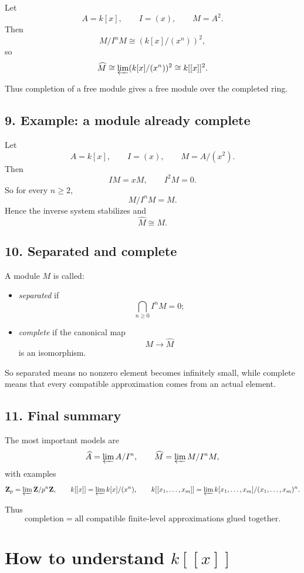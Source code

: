 \documentclass[12pt,a4paper]{article}
\theoremstyle{plain}
\theoremstyle{definition}      %
\begin{document}
	Let
	\[
	A=k[x],\qquad I=(x),\qquad M=A^2.
	\]
	Then
	\[
	M/I^nM \cong (k[x]/(x^n))^2,
	\]
	so
	\[
	\widehat M \cong \varprojlim (k[x]/(x^n))^2 \cong k[[x]]^2.
	\]
	
	Thus completion of a free module gives a free module over the completed ring.
	
	\subsection*{9. Example: a module already complete}
	
	Let
	\[
	A=k[x],\qquad I=(x),\qquad M=A/(x^2).
	\]
	Then
	\[
	IM=xM,\qquad I^2M=0.
	\]
	So for every \(n\ge2\),
	\[
	M/I^nM=M.
	\]
	Hence the inverse system stabilizes and
	\[
	\widehat M\cong M.
	\]
	
	\subsection*{10. Separated and complete}
	
	A module \(M\) is called:
	\begin{itemize}
		\item \emph{separated} if
		\[
		\bigcap_{n\ge0} I^nM=0;
		\]
		\item \emph{complete} if the canonical map
		\[
		M\to \widehat M
		\]
		is an isomorphism.
	\end{itemize}
	
	So separated means no nonzero element becomes infinitely small, while complete means that every compatible approximation comes from an actual element.
	
	\subsection*{11. Final summary}
	
	The most important models are
	\[
	\widehat A=\varprojlim A/I^n,
	\qquad
	\widehat M=\varprojlim M/I^nM,
	\]
	with examples
	\[
	\mathbf Z_p=\varprojlim \mathbf Z/p^n\mathbf Z,
	\qquad
	k[[x]]=\varprojlim k[x]/(x^n),
	\qquad
	k[[x_1,\dots,x_m]]
	=
	\varprojlim k[x_1,\dots,x_m]/(x_1,\dots,x_m)^n.
	\]
	
	Thus
	\[
	\boxed{
		\text{completion}=
		\text{all compatible finite-level approximations glued together}.
	}
	\]
	
	\section*{How to understand \(k[[x]]\)}
	
\end{document}
